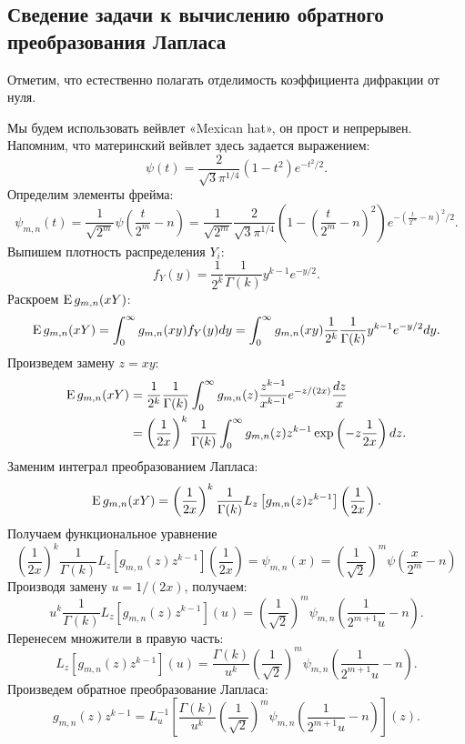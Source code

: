 \documentclass[../paper.tex]{subfiles}
\begin{document}
\subsection{Сведение задачи к вычислению обратного преобразования Лапласа}
Отметим, что естественно полагать отделимость коэффициента дифракции от нуля.

Мы будем использовать вейвлет «Mexican hat», он прост и непрерывен. Напомним, что материнский вейвлет здесь задается выражением:
\[
    \psi(t) = \frac{2}{\sqrt{3} \pi^{1 / 4}} (1-t^2)e^{-t^2 / 2}
.\]
Определим элементы фрейма:
\[
    \psi_{m,n}(t) = 
    \frac{1}{\sqrt{2^m}} \psi\left( \frac{t}{2^m}-n \right) =
    \frac{1}{\sqrt{2^m} }\frac{2}{\sqrt{3} \pi^{1 / 4}} \left(1-\left( \frac{t}{2^m} - n \right)^2 \right) e^{-\left( \frac{t}{2^m} - n \right)^2 / 2}
.\]
Выпишем плотность распределения $Y_i$:
\[
	f_Y(y) = \frac{1}{2^k} \frac{1}{\Gamma(k)} y^{k-1} e^{-y / 2}
.\]
Раскроем $\operatorname{E} g_{m,n}(xY)$:
\[
	\operatorname{E} g_{m,n}(xY)
	= \int_0^\infty g_{m,n}(xy) f_Y(y) dy
	= \int_0^\infty g_{m,n}(xy) \frac{1}{2^k} \frac{1}{\Gamma(k)} y^{k-1} e^{-y / 2} dy
.\]
Произведем замену $z = xy$:
\begin{align*}
	\operatorname{E} g_{m,n}(xY)
	&= \frac{1}{2^k}\frac{1}{\Gamma(k)} \int_0^\infty g_{m,n}(z) \frac{z^{k-1}}{x^{k-1}} e^{-z/(2x)} \frac{dz}{x}
	\\&= \left(\frac{1}{2x}\right)^k \frac{1}{\Gamma(k)} \int_0^\infty g_{m,n}(z) z^{k-1} \exp\left(-z \frac{1}{2x}\right) dz
.\end{align*}
%
Заменим интеграл преобразованием Лапласа:
\[
	\operatorname{E} g_{m,n}(xY)
	= \left( \frac{1}{2x} \right)^k \frac{1}{\Gamma(k)} L_z \left[g_{m,n}(z) z^{k-1}\right] \left( \frac{1}{2x} \right)
.\]
%
Получаем функциональное уравнение
\[
	\left( \frac{1}{2x} \right)^k \frac{1}{\Gamma(k)} L_z \left[g_{m,n}(z) z^{k-1}\right] \left( \frac{1}{2x} \right)
	= \psi_{m,n}(x)
	= \left( \frac{1}{\sqrt{2} } \right)^m \psi \left( \frac{x}{2^m} - n \right) 
\]
%
Производя замену $u = 1/(2x)$, получаем:
\[
    u^k \frac{1}{\Gamma(k)} L_z \left[g_{m,n}(z) z^{k-1}\right] \left( u \right)
    = \left( \frac{1}{\sqrt{2} } \right)^m \psi_{m,n} \left( \frac{1}{2^{m+1} u} - n \right) 
.\]
%
Перенесем множители в правую часть:
\[
    L_z \left[g_{m,n}(z) z^{k-1}\right] \left( u \right)
    = \frac{\Gamma(k)}{u^k} \left( \frac{1}{\sqrt{2} } \right)^m \psi_{m,n} \left( \frac{1}{2^{m+1} u} - n \right)
.\]
%
Произведем обратное преобразование Лапласа:
\[
    g_{m,n}(z) z^{k-1}
    = L^{-1}_u \left[ \frac{\Gamma(k)}{u^k} \left( \frac{1}{\sqrt{2} } \right)^m \psi_{m,n} \left( \frac{1}{2^{m+1} u} - n \right) \right] (z)
.\]
\end{document}
